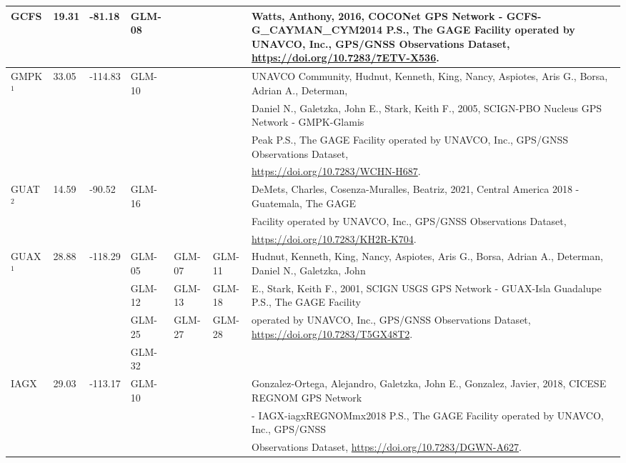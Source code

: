 \begin{landscape}
\begin{longtable}{llllllp{12cm}}
    \multirow{3}{*}{GCFS} & \multirow{3}{*}{19.31} & \multirow{3}{*}{-81.18} & \multirow{3}{*}{GLM-08} & & & Watts, Anthony, 2016, COCONet GPS Network - GCFS-G\_CAYMAN\_CYM2014 P.S., The GAGE Facility operated by UNAVCO, Inc., GPS/GNSS Observations Dataset, \url{https://doi.org/10.7283/7ETV-X536}.\\\hline
    \multirow{4}{*}{GMPK\hyperlink{Hudnut}{${}^1$}} & \multirow{4}{*}{33.05} & \multirow{4}{*}{-114.83} & \multirow{4}{*}{GLM-10} & & & UNAVCO Community, Hudnut, Kenneth, King, Nancy, Aspiotes, Aris G., Borsa, Adrian A., Determan, \\
    &&&&&& Daniel N., Galetzka, John E., Stark, Keith F., 2005, SCIGN-PBO Nucleus GPS Network - GMPK-Glamis \\
    &&&&&& Peak P.S., The GAGE Facility operated by UNAVCO, Inc., GPS/GNSS Observations Dataset, \\
    &&&&&& \url{https://doi.org/10.7283/WCHN-H687}.\\\hline
    \multirow{3}{*}{GUAT\hyperlink{Garnier}{${}^2$}} & \multirow{3}{*}{14.59} & \multirow{3}{*}{-90.52} & \multirow{3}{*}{GLM-16} & & & DeMets, Charles, Cosenza-Muralles, Beatriz, 2021, Central America 2018 - Guatemala, The GAGE \\
    &&&&&& Facility operated by UNAVCO, Inc., GPS/GNSS Observations Dataset, \\
    &&&&&& \url{https://doi.org/10.7283/KH2R-K704}.\\\hline
\multirow{4}{*}{GUAX\hyperlink{Hudnut}{${}^1$}} & \multirow{4}{*}{28.88} & \multirow{4}{*}{-118.29} & GLM-05 & GLM-07 & GLM-11 & Hudnut, Kenneth, King, Nancy, Aspiotes, Aris G., Borsa, Adrian A., Determan, Daniel N., Galetzka, John \\
    &&&GLM-12& GLM-13& GLM-18 & E., Stark, Keith F., 2001, SCIGN USGS GPS Network - GUAX-Isla Guadalupe P.S., The GAGE Facility \\
    &&& GLM-25 &GLM-27 &GLM-28& operated by UNAVCO, Inc., GPS/GNSS Observations Dataset, \url{https://doi.org/10.7283/T5GX48T2}.\\
    &&& GLM-32 &       &     &  \\\hline
    \multirow{3}{*}{IAGX} & \multirow{3}{*}{29.03} & \multirow{3}{*}{-113.17} & \multirow{3}{*}{GLM-10} & & & Gonzalez-Ortega, Alejandro, Galetzka, John E., Gonzalez, Javier, 2018, CICESE REGNOM GPS Network \\
    &&&&&& - IAGX-iagxREGNOMmx2018 P.S., The GAGE Facility operated by UNAVCO, Inc., GPS/GNSS  \\
    &&&&&& Observations Dataset, \url{https://doi.org/10.7283/DGWN-A627}. \\\hline

\end{longtable}
\end{landscape}
